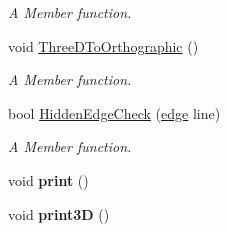\begin{DoxyCompactItemize}
\begin{DoxyCompactList}\small\item\em A Member function. \end{DoxyCompactList}\item 
void \hyperlink{classThreeDGraph__class_ae69c2ee22498d903d1afa6b988edd1b6}{Three\+D\+To\+Orthographic} ()
\begin{DoxyCompactList}\small\item\em A Member function. \end{DoxyCompactList}\item 
bool \hyperlink{classThreeDGraph__class_a2cfae37ac914b040194e3dae011454d6}{Hidden\+Edge\+Check} (\hyperlink{structedge}{edge} line)
\begin{DoxyCompactList}\small\item\em A Member function. \end{DoxyCompactList}\item 
void {\bfseries print} ()\hypertarget{classThreeDGraph__class_af53c26ef3f673e77e1213789fe14c8a2}{}\label{classThreeDGraph__class_af53c26ef3f673e77e1213789fe14c8a2}

\item 
void {\bfseries print3D} ()\hypertarget{classThreeDGraph__class_a08a1a3131c7090b8f783809f07810725}{}\label{classThreeDGraph__class_a08a1a3131c7090b8f783809f07810725}

\end{DoxyCompactItemize}

